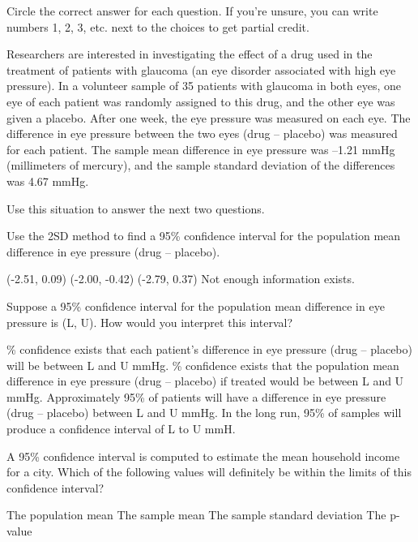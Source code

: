 \documentclass{article}
\begin{document}
	Circle the correct answer for each question.  If you're unsure, you can write numbers 1, 2, 3, etc. next to the choices to get partial credit.\\[.5cm]
	
	\begin{mcquestions}
		
		\begin{mcquestioninstruction}
			Researchers are interested in investigating the effect of a drug used in the treatment of patients with glaucoma (an eye disorder associated with high eye pressure). In a volunteer sample of 35 patients with glaucoma in both eyes, one eye of each patient was randomly assigned to this drug, and the other eye was given a placebo. After one week, the eye pressure was measured on each eye. The difference in eye pressure between the two eyes (drug – placebo) was measured for each patient. The sample mean difference in eye pressure was –1.21 mmHg (millimeters of mercury), and the sample standard deviation of the differences was 4.67 mmHg.
			
			Use this situation to answer the next two questions.
		\end{mcquestioninstruction}
		
		\question Use the 2SD method to find a 95\% confidence interval for the population mean difference in eye pressure (drug – placebo).
		\begin{mcanswerslist}
			\answer  (-2.51, 0.09)
			\answer  (-2.00, -0.42)
			\answer[correct]  (-2.79, 0.37)
			\answer  Not enough information exists.
		\end{mcanswerslist}
		
		\question[follow] Suppose a 95\% confidence interval for the population mean difference in eye pressure is (L, U). How would you interpret this interval?
		\begin{mcanswerslist}
			\% confidence exists that each patient's difference in eye pressure (drug – placebo) will be between L and U mmHg.
			\% confidence exists that the population mean difference in eye pressure (drug – placebo) if treated would be between L and U mmHg.
			\answer  Approximately 95\% of patients will have a difference in eye pressure (drug – placebo) between L and U mmHg.
			\answer  In the long run, 95\% of samples will produce a confidence interval of L to U mmH.
		\end{mcanswerslist}
		
		\question A 95\% confidence interval is computed to estimate the mean household income for a city. Which of the following values will definitely be within the limits of this confidence interval?
		\begin{mcanswerslist}
			\answer  The population mean
			\answer[correct]  The sample mean
			\answer  The sample standard deviation
			\answer  The p-value
		\end{mcanswerslist}		
		

\end{mcquestions}
\end{document}
